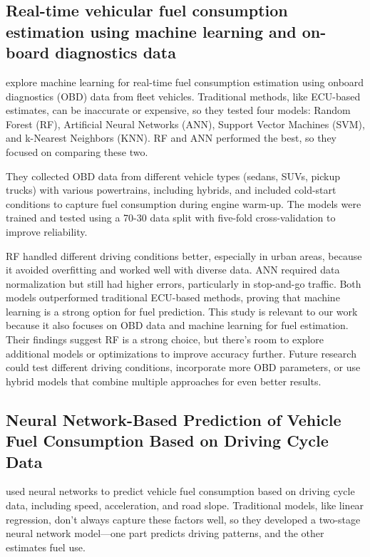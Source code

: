 \documentclass[letterpaper]{article}
\begin{document}
\subsection*{Real-time vehicular fuel consumption estimation using machine
learning and on-board diagnostics data}

\cite{abediasl2024real} explore machine learning for real-time fuel consumption estimation
using onboard diagnostics (OBD) data from fleet vehicles. Traditional methods,
like ECU-based estimates, can be inaccurate or expensive, so they tested four
models: Random Forest (RF), Artificial Neural Networks (ANN), Support Vector
Machines (SVM), and k-Nearest Neighbors (KNN). RF and ANN performed the best, so
they focused on comparing these two. 

They collected OBD data from different
vehicle types (sedans, SUVs, pickup trucks) with various powertrains, including
hybrids, and included cold-start conditions to capture fuel consumption during
engine warm-up. The models were trained and tested using a 70-30 data split with
five-fold cross-validation to improve reliability. 

RF handled different driving
conditions better, especially in urban areas, because it avoided overfitting and
worked well with diverse data. ANN required data normalization but still had
higher errors, particularly in stop-and-go traffic. Both models outperformed
traditional ECU-based methods, proving that machine learning is a strong option
for fuel prediction. This study is relevant to our work because it also focuses
on OBD data and machine learning for fuel estimation. Their findings suggest RF
is a strong choice, but there's room to explore additional models or
optimizations to improve accuracy further. Future research could test different
driving conditions, incorporate more OBD parameters, or use hybrid models that
combine multiple approaches for even better results.

\subsection{Neural Network-Based Prediction of Vehicle Fuel Consumption Based on
Driving Cycle Data}

\cite{topic2022neural} used neural networks to predict vehicle fuel consumption based on
driving cycle data, including speed, acceleration, and road slope. Traditional
models, like linear regression, don't always capture these factors well, so they
developed a two-stage neural network model---one part predicts driving patterns,
and the other estimates fuel use. 
\end{document}
